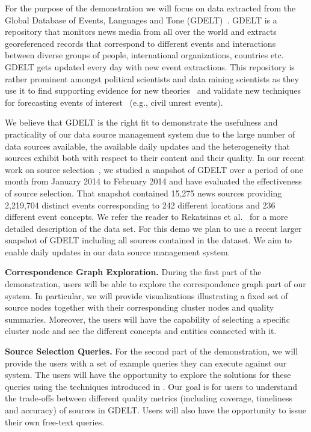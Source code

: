 \documentclass{sig-alternate}
\begin{document}
For the purpose of the demonstration we will focus on data extracted from the Global Database of Events, Languages and Tone (GDELT)~\cite{leetaru_ap:2013}. GDELT is a repository that monitors news media from all over the world and extracts georeferenced records that correspond to different events and interactions between diverse groups of people, international organizations, countries etc. GDELT gets updated every day with new event extractions. This repository is rather prominent amongst political scientists and data mining scientists as they use it to find supporting evidence for new theories~\cite{schutte_ap:2014} and validate new techniques for forecasting events of interest~\cite{keneshloo_ap:2014} (e.g., civil unrest events). 

We believe that GDELT is the right fit to demonstrate the usefulness and practicality of our data source management system due to the large number of data sources available, the available daily updates and the heterogeneity that sources exhibit both with respect to their content and their quality. In our recent work on source selection~\cite{rekatsinas_ap:2014}, we studied a snapshot of GDELT over a period of one month from January 2014 to February 2014 and have evaluated the effectiveness of source selection. That snapshot contained 15,275 news sources providing 2,219,704 distinct events corresponding to 242 different locations and 236 different event concepts. We refer the reader to Rekatsinas et al.~\cite{rekatsinas_ap:2014} for a more detailed description of the data set. For this demo we plan to use a recent larger snapshot of GDELT including all sources contained in the dataset. We aim to enable daily updates in our data source management system.

\vspace{3pt}\noindent\textbf{Correspondence Graph Exploration.} During the first part of the demonstration, users will be able to explore the correspondence graph part of our system. In particular, we will provide visualizations illustrating a fixed set of source nodes together with their corresponding cluster nodes and quality summaries. Moreover, the users will have the capability of selecting a specific cluster node and see the different concepts and entities connected with it.

\vspace{3pt}\noindent\textbf{Source Selection Queries.} For the second part of the demonstration, we will provide the users with a set of example queries they can execute against our system. The users will have the opportunity to explore the solutions for these queries using the techniques introduced in . Our goal is for users to understand the trade-offs between different quality metrics (including coverage, timeliness and accuracy) of sources in GDELT. Users will also have the opportunity to issue their own free-text queries.
\end{document}

